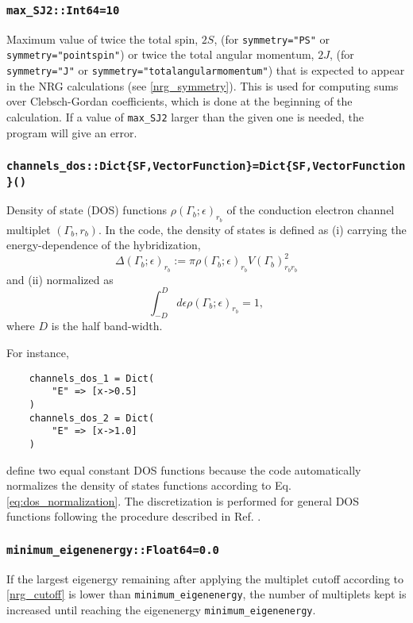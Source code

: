 \documentclass[notitlepage]{article}
\begin{document}
\subsubsection{\texttt{max\_SJ2::Int64=10}}
\label{nrg_maxsj2}
Maximum value of twice the total spin, $2S$, (for
\texttt{symmetry="PS"} or \texttt{symmetry="pointspin"}) or
twice the total angular momentum, $2J$, (for \texttt{symmetry="J"} or
\texttt{symmetry="totalangularmomentum"}) that is expected
to appear in the NRG calculations (see \ref{nrg_symmetry}).
This is used for computing sums over Clebsch-Gordan
coefficients, which is done at the beginning of the
calculation. If a value of \texttt{max\_SJ2} larger than the
given one is needed, the program will give an error.

\subsubsection{\texttt{channels\_dos::Dict\{SF,Vector{Function}\}=Dict\{SF,Vector{Function}\}()}}
\label{nrg_channelsdos}
Density of state (DOS) functions $\rho(\Gamma_b;\epsilon)_{r_b}$ of the
conduction electron channel multiplet $(\Gamma_b,r_b)$. In
the code, the density of states is defined as (i) carrying the
energy-dependence of the hybridization,
\begin{equation}
    \Delta(\Gamma_b;\epsilon)_{r_b}
    :=
    \pi
    \rho(\Gamma_b;\epsilon)_{r_b}
    V(\Gamma_b)_{r_b r_b}^2
\end{equation}
and (ii) normalized as
\begin{equation}
    \int_{-D}^D d\epsilon \rho(\Gamma_b;\epsilon)_{r_b} = 1,
    \label{eq:dos_normalization}
\end{equation}
where $D$ is the half band-width.
\par
For instance,
\begin{verbatim}
    channels_dos_1 = Dict(
        "E" => [x->0.5]
    )
    channels_dos_2 = Dict(
        "E" => [x->1.0]
    )
\end{verbatim}
define two equal constant DOS functions because the code
automatically normalizes the density of states functions
according to Eq. \ref{eq:dos_normalization}. The
discretization is performed for general DOS functions
following the procedure described in Ref. \cite{chen1995}.


\subsubsection{\texttt{minimum\_eigenenergy::Float64=0.0}}
\label{nrg_minimumeigenenergy}
If the largest eigenergy remaining after applying the
multiplet cutoff according to \ref{nrg_cutoff} is lower than
\texttt{minimum\_eigenenergy}, the number of multiplets kept
is increased until reaching the eigenenergy
\texttt{minimum\_eigenenergy}.
\end{document}
